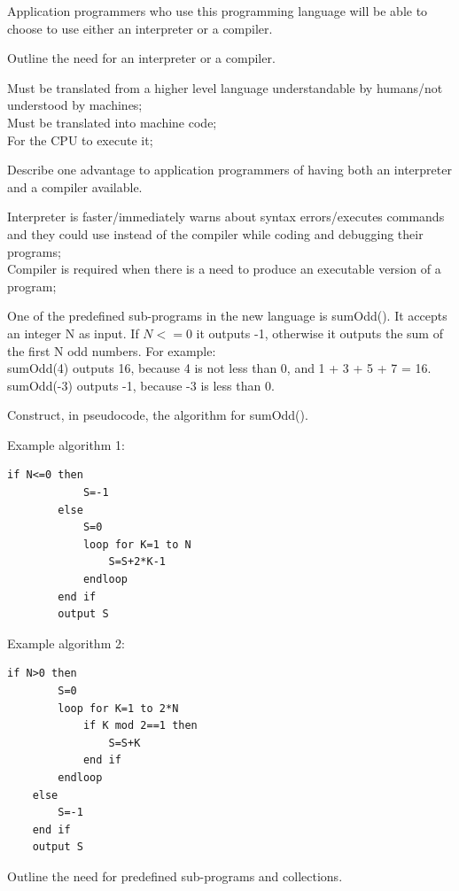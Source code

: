 \begin{exercise*}
Application programmers who use this programming language will be able to choose to use either an interpreter or a compiler.
\begin{parts}
\item Outline the need for an interpreter or a compiler.
	\begin{solution}
	Must be translated from a higher level language understandable by humans/not understood by machines;\\
	Must be translated into machine code;\\
	For the CPU to execute it;\\
	\end{solution}
\item Describe one advantage to application programmers of having both an interpreter and a compiler available.
	\begin{solution}
		Interpreter is faster/immediately warns about syntax errors/executes commands and they could use instead of the compiler while coding and debugging their programs;\\
		Compiler is required when there is a need to produce an executable version of a program;
	\end{solution}
\end{parts}
One of the predefined sub-programs in the new language is sumOdd(). It accepts an integer N as input. If $N <= 0$ it outputs -1, otherwise it outputs the sum of the first N odd numbers.
For example:\\
sumOdd(4) outputs 16, because 4 is not less than 0, and 1 + 3 + 5 + 7 = 16.
sumOdd(-3) outputs -1, because -3 is less than 0.
\begin{parts}
\item Construct, in pseudocode, the algorithm for sumOdd().
	\begin{solution}
		Example algorithm 1:
		\begin{Verbatim}[tabsize=4]
		if N<=0 then
			S=-1
		else
			S=0
			loop for K=1 to N
				S=S+2*K-1
			endloop
		end if
		output S
		\end{Verbatim}
Example algorithm 2:
	\begin{Verbatim}[tabsize=4]
	if N>0 then	
		S=0	
		loop for K=1 to 2*N	
			if K mod 2==1 then	
				S=S+K	
			end if	
		endloop	
	else	
		S=-1	
	end if	
	output S
	\end{Verbatim}

	\end{solution}
\item Outline the need for predefined sub-programs and collections.
\end{parts}
\end{exercise*}




